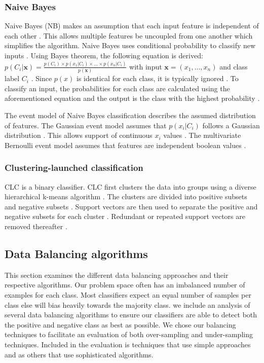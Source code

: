 \documentclass{sig-alternate-05-2015}
\begin{document}
	\subsubsection{Naive Bayes}
	Naive Bayes (NB) makes an assumption that each input feature is independent of each other \cite{Lewis1998, rish2001empirical}. This allows multiple features be uncoupled from one another which simplifies the algorithm. Naive Bayes uses conditional probability to classify new inputs \cite{Lewis1998}. Using Bayes theorem, the following equation is derived: $p(C_i|\textbf{x}) = \frac{p(C_i) \times p(x_1|C_i) \times...\times p(x_n|C_i)}{p(\textbf{x})}$ with input $\textbf{x} = (x_1,...,x_n)$ and class label $C_i$ \cite{Lewis1998, rish2001empirical}. Since $p(\textit{x})$ is identical for each class, it is typically ignored \cite{rish2001empirical}. To classify an input, the probabilities for each class are calculated using the aforementioned equation and the output is the class with the highest probability \cite{Lewis1998}.
	
	The event model of Naive Bayes classification describes the assumed distribution of features. The Gaussian event model assumes that $p(x_i|C_i)$ follows a Gaussian distribution \cite{John:1995:ECD:2074158.2074196}. This allows support of continuous $x_i$ values \cite{John:1995:ECD:2074158.2074196}. The multivariate Bernoulli event model assumes that features are independent boolean values \cite{mccallum1998comparison}.
	
	\subsubsection{Clustering-launched classification}
	CLC is a binary classifier. CLC first clusters the data into groups using a diverse hierarchical k-means algorithm \cite{Luo20097562}. The clusters are divided into positive subsets and negative subsets \cite{Luo20097562}. Support vectors are then used to separate the positive and negative subsets for each cluster \cite{Luo20097562}. Redundant or repeated support vectors are removed thereafter \cite{Luo20097562}.
	
	\subsection{Data Balancing algorithms}
	This section examines the different data balancing approaches and their respective algorithms. Our problem space often has an imbalanced number of examples for each class. Most classifiers expect an equal number of samples per class else will bias heavily towards the majority class. we include an analysis of several data balancing algorithms to ensure our classifiers are able to detect both the positive and negative class as best as possible. We chose our balancing techniques to facilitate an evaluation of both over-sampling and under-sampling techniques. Included in the evaluation is techniques that use simple approaches and as others that use sophisticated algorithms.
\end{document}
